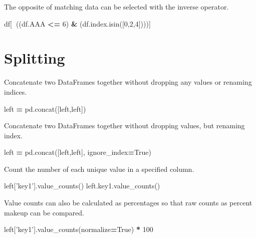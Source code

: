 \documentclass[]{book}
\newenvironment{Shaded}{\begin{snugshade}}{\end{snugshade}}
\newcommand{\DecValTok}[1]{\textcolor[rgb]{0.00,0.00,0.81}{#1}}
\newcommand{\NormalTok}[1]{#1}
\newcommand{\OperatorTok}[1]{\textcolor[rgb]{0.81,0.36,0.00}{\textbf{#1}}}
\newcommand{\StringTok}[1]{\textcolor[rgb]{0.31,0.60,0.02}{#1}}
\newcommand{\VariableTok}[1]{\textcolor[rgb]{0.00,0.00,0.00}{#1}}
\begin{document}
The opposite of matching data can be selected with the inverse operator.

\begin{Shaded}
\begin{Highlighting}[]
\NormalTok{df[}\OperatorTok{~}\NormalTok{((df.AAA }\OperatorTok{<=} \DecValTok{6}\NormalTok{) }\OperatorTok{&}\NormalTok{ (df.index.isin([}\DecValTok{0}\NormalTok{,}\DecValTok{2}\NormalTok{,}\DecValTok{4}\NormalTok{])))]}
\end{Highlighting}
\end{Shaded}

\hypertarget{splitting}{%
\section{Splitting}\label{splitting}}

Concatenate two DataFrames together without dropping any values or renaming indices.

\begin{Shaded}
\begin{Highlighting}[]
\NormalTok{left }\OperatorTok{=}\NormalTok{ pd.concat([left,left])}
\end{Highlighting}
\end{Shaded}

Concatenate two DataFrames together without dropping values, but renaming index.

\begin{Shaded}
\begin{Highlighting}[]
\NormalTok{left }\OperatorTok{=}\NormalTok{ pd.concat([left,left], ignore_index}\OperatorTok{=}\VariableTok{True}\NormalTok{)}
\end{Highlighting}
\end{Shaded}

Count the number of each unique value in a specified column.

\begin{Shaded}
\begin{Highlighting}[]
\NormalTok{left[}\StringTok{'key1'}\NormalTok{].value_counts()}
\NormalTok{left.key1.value_counts()}
\end{Highlighting}
\end{Shaded}

Value counts can also be calculated as percentages so that raw counts as percent makeup can be compared.

\begin{Shaded}
\begin{Highlighting}[]
\NormalTok{left[}\StringTok{'key1'}\NormalTok{].value_counts(normalize}\OperatorTok{=}\VariableTok{True}\NormalTok{) }\OperatorTok{*} \DecValTok{100}
\end{Highlighting}
\end{Shaded}
\end{document}
